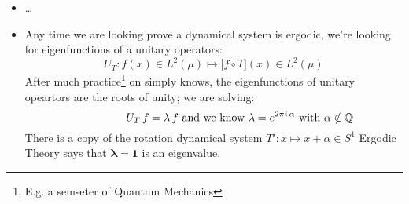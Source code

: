 \documentclass[12pt]{article}
\begin{document}
\begin{itemize}
\item \dots
\item Any time we are looking prove a dynamical system is ergodic, we're looking for eigenfunctions of a unitary operators: 
$$ U_T: f(x) \in L^2(\mu) \mapsto \big[f \circ T \big] (x) \in L^2(\mu) $$
After much practice\footnote{E.g. a semseter of Quantum Mechanics} on simply knows, the eigenfunctions of unitary opeartors are the roots of unity; we are solving:
$$ \hspace{0.65in} U_T \, f = \lambda \, f \text{ and we know } \lambda = e^{2\pi i \, \alpha} \text{ with } \alpha \notin \mathbb{Q}$$ 
There is a copy of the rotation dynamical  system $T': x \mapsto x + \alpha \in S^1$ Ergodic Theory says that $\mathbf{\lambda = 1}$ is an eigenvalue. 
\end{itemize}

\newpage
\end{document}
